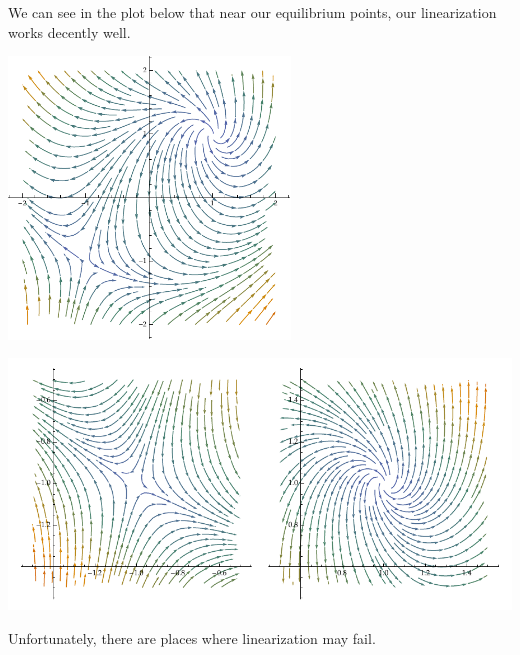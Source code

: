 \documentclass[10pt]{mypackage}
\begin{document}
\begin{example}
  We can see in the plot below that near our equilibrium points, our linearization works decently well.
  \begin{center}
    \includegraphics[width=7.5cm]{images/linearizing_system_1.pdf}\break

    \includegraphics[width=15cm]{images/linearizing_system_1_zoomed.pdf}
  \end{center}
\end{example}
Unfortunately, there are places where linearization may fail.
\end{document}
